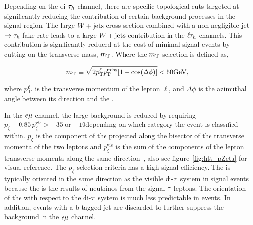 Depending on the di-$\tau_{h}$ channel, there are specific topological cuts targeted at significantly
reducing the contribution of certain background processes in the signal region.  The large $W+\text{jets}$
cross section combined with a non-negligible jet $\to \tau_{h}$ fake rate leads to a large $W+\text{jets}$
contribution in the $\ell\tau_{h}$ channels.  This contribution is significantly reduced at the cost of
minimal signal events by cutting on the transverse mass, $m_\mathrm{T}$.  Where the $m_\mathrm{T}$ selection is defined as,

\begin{equation}
m_\mathrm{T} \equiv \sqrt{\smash[b]{2 p_\mathrm{T}^\ell p_\mathrm{T}^\text{miss} [1-\cos(\Delta\phi)]}} < 50\mathrm{GeV},
\end{equation}

where $p_\mathrm{T}^\ell$ is the transverse momentum of the lepton $\ell$,
and $\Delta\phi$ is the azimuthal angle between its direction and the \etvecmiss.

In the $e\mu$ channel, the large \ttbar background is reduced by requiring 
$p_\zeta - 0.85 \, p_\zeta^{\text{vis}} > -35$ or $-10$\GeV depending on which category the event is
classified within.  $p_\zeta$ is the component of the \etvecmiss projected along the bisector 
of the transverse momenta of the two leptons and $p_\zeta^{\text{vis}}$ is the sum of the components 
of the lepton transverse momenta along the same direction~\cite{Khachatryan:2014wca}, also see
figure~\ref{fig:htt_pZeta} for visual reference.
The $p_\zeta$ selection criteria has a high signal efficiency. The \etvecmiss is typically oriented
in the same direction as the visible di-$\tau$ system in signal events because the \etvecmiss is 
the results of neutrinos from the signal $\tau$ leptons.  The orientation of the \etvecmiss with respect
to the di-$\tau$ system is much less predictable in \ttbar events.  In addition, events with a b-tagged 
jet are discarded to further suppress the \ttbar background in the $e\mu$ channel.

